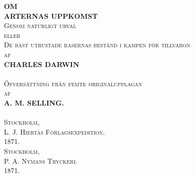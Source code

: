 \begin{titlepage}
\begin{center}

{\LARGE \bf OM \\[0.3cm]  ARTERNAS UPPKOMST}\\[0.5cm]

\textsc{\large Genom naturligt urval}\\[0.4cm]

\textsc{\normalsize eller}\\[0.5cm]

\textsc{\large De bäst utrustade rasernas bestånd
i kampen för tillvaron}\\[0.4cm]

\textsc{\normalsize af}\\[0.5cm]

{\normalsize \bf CHARLES DARWIN}\\[0.3cm]

\HRule\\[0.5cm]

\textsc{\normalsize Öfversättning från femte originalupplagan}\\[0.5cm]

\textsc{\normalsize af}\\[0.5cm]

{\normalsize \bf A. M. SELLING.}\\[0.3cm]

\HRule\\[0.5cm]

\textsc{\large Stockholm,}\\[0.2cm]

\textsc{\normalsize L. J. Hiertas Förlagsexpedition.}\\[0.2cm]
\textsc{\normalsize 1871.}\\[0.5cm]
\pagebreak
\vspace*{1cm}
\vfill
\textsc{\large Stockholm,}\\[0.2cm]
\textsc{\large P. A. Nymans Tryckeri.}\\[0.2cm]
\textsc{\large 1871.}

\end{center}

\end{titlepage}

